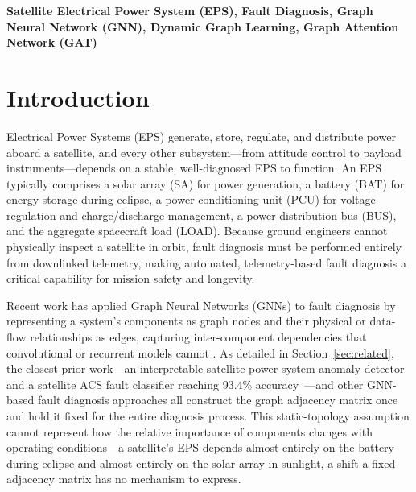 \documentclass[conference]{IEEEtran}
\begin{document}
\begin{IEEEkeywords}
\textbf{Satellite Electrical Power System (EPS), Fault Diagnosis, Graph Neural Network (GNN), Dynamic Graph Learning, Graph Attention Network (GAT)}
\end{IEEEkeywords}

\section{Introduction}

Electrical Power Systems (EPS) generate, store, regulate, and distribute power aboard a
satellite, and every other subsystem---from attitude control to payload instruments---depends
on a stable, well-diagnosed EPS to function. An EPS typically comprises a solar array (SA) for
power generation, a battery (BAT) for energy storage during eclipse, a power conditioning unit
(PCU) for voltage regulation and charge/discharge management, a power distribution bus (BUS),
and the aggregate spacecraft load (LOAD). Because ground engineers cannot physically inspect a
satellite in orbit, fault diagnosis must be performed entirely from downlinked telemetry, making automated,
telemetry-based fault diagnosis a critical capability for mission safety and longevity.

Recent work has applied Graph Neural Networks (GNNs) to fault diagnosis by representing a
system's components as graph nodes and their physical or data-flow relationships as edges,
capturing inter-component dependencies that convolutional or recurrent models cannot
\cite{bdi,b1,b2,b3}. As detailed in Section~\ref{sec:related}, the closest prior work---an
interpretable satellite power-system anomaly detector~\cite{bdi} and a satellite ACS fault
classifier reaching 93.4\% accuracy~\cite{b1}---and other GNN-based fault diagnosis approaches
\cite{b4,b5,b6} all construct the graph adjacency matrix once and hold it fixed for the entire
diagnosis process. This static-topology assumption cannot represent how the relative
importance of components changes with operating conditions---a satellite's EPS depends almost
entirely on the battery during eclipse and almost entirely on the solar array in sunlight, a
shift a fixed adjacency matrix has no mechanism to express.
\end{document}
